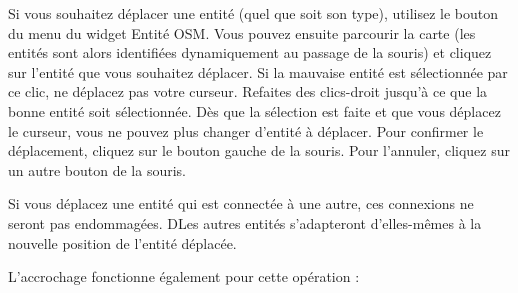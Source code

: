 Si vous souhaitez déplacer une entité (quel que soit son type), utilisez le bouton\\  du menu du widget Entité OSM. Vous pouvez ensuite parcourir la carte (les entités sont alors identifiées dynamiquement au passage de la souris) et cliquez sur l'entité que vous souhaitez déplacer. Si la mauvaise entité est sélectionnée par ce clic, ne déplacez pas votre curseur. Refaites des clics-droit jusqu'à ce que la bonne entité soit sélectionnée. Dès que la sélection est faite et que vous déplacez le curseur, vous ne pouvez plus changer d'entité à déplacer. Pour confirmer le déplacement, cliquez sur le bouton gauche de la souris. Pour l'annuler, cliquez sur un autre bouton de la souris.

Si vous déplacez une entité qui est connectée à une autre, ces connexions ne seront pas endommagées. DLes autres entités s'adapteront d'elles-mêmes à la nouvelle position de l'entité déplacée.

L'accrochage fonctionne également pour cette opération :

